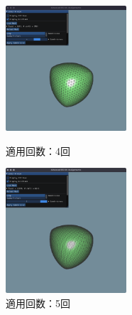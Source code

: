 \documentclass[a4paper,10pt,uplatex,dvipdfmx]{jsarticle}
\begin{document}
\begin{figure}[htbp]
  \begin{minipage}{0.33\hsize}
    \begin{center}
      \includegraphics[width=45mm]{img/loop-cube-4.png}
      \caption{適用回数：4回}
    \end{center}
  \end{minipage}
  \begin{minipage}{0.33\hsize}
    \begin{center}
      \includegraphics[width=45mm]{img/loop-cube-5.png}
      \caption{適用回数：5回}
    \end{center}
  \end{minipage}
\end{figure}
\end{document}
